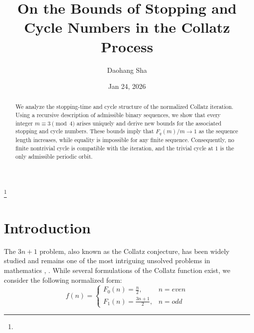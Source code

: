 \documentclass{amsart}
\theoremstyle{definition}
\theoremstyle{remark}
\numberwithin{equation}{section}
\begin{document}
\title{On the Bounds of Stopping and Cycle Numbers in the Collatz Process}


\author{Daohang Sha}
\address{}
\thanks{}


\date{Jan 24, 2026}



\begin{abstract}
	We analyze the stopping-time and cycle structure of the normalized Collatz
	iteration. Using a recursive description of admissible binary sequences, we show
	that every integer $m \equiv 3 \pmod{4}$ arises uniquely and derive new bounds for
	the associated stopping and cycle numbers. These bounds imply that
	$F_{q}(m)/m \to 1$ as the sequence length increases, while equality is impossible
	for any finite sequence. Consequently, no finite nontrivial cycle is compatible
	with the iteration, and the trivial cycle at $1$ is the only admissible periodic
	orbit.
\end{abstract}


\maketitle


\sloppy

\section{Introduction}
The $3n+1$ problem, also known as the Collatz conjecture, has been widely studied and remains one of the most intriguing unsolved problems in mathematics \cite{La11}, \cite{La12}. While several formulations of the Collatz function exist, we consider the following normalized form:
$$f(n)=\begin{cases}
	F_0(n)=\frac{n}{2}, & n = even \\
	F_1(n)=\frac{3n+1}{2}, & n = odd
\end{cases}$$
\end{document}

